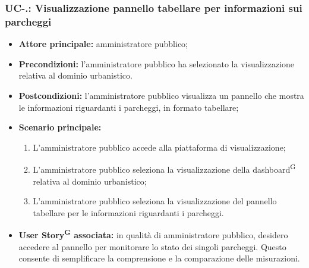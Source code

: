 \documentclass[8pt]{article}
\newcommand{\glossterm}[1]{#1\textsuperscript{G}} %
\begin{document}
\subsubsection*{UC-\theuc .\speconenumber: Visualizzazione pannello tabellare per informazioni sui parcheggi}
\begin{itemize}
    \item \textbf{Attore principale:} amministratore pubblico;
    \item \textbf{Precondizioni:} l'amministratore pubblico ha selezionato la visualizzazione
        relativa al dominio urbanistico.
    \item \textbf{Postcondizioni:} l'amministratore pubblico visualizza un pannello che mostra le informazioni riguardanti i parcheggi, in formato tabellare;
    \item \textbf{Scenario principale:} 
    \begin{enumerate}
    \item L'amministratore pubblico accede alla piattaforma di visualizzazione;
    \item L'amministratore pubblico seleziona la visualizzazione della \glossterm{dashboard} relativa al dominio
        urbanistico;
    \item L'amministratore pubblico seleziona la visualizzazione del pannello tabellare per le informazioni riguardanti i parcheggi.
    \end{enumerate}
    \item \textbf{\glossterm{User Story} associata:} in qualità di amministratore pubblico, desidero accedere al pannello per monitorare lo stato dei singoli parcheggi. Questo consente di semplificare la comprensione e la comparazione delle misurazioni.
\end{itemize}
\end{document}
